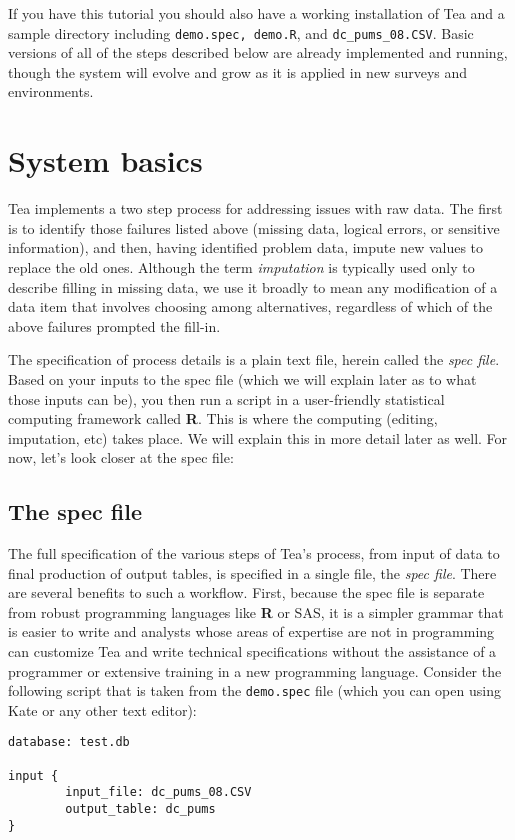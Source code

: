 \documentclass{article}
\begin{document}
If you have this tutorial you should also have a working installation of Tea and 
a sample directory including {\tt demo.spec, demo.R}, and {\tt dc\_pums\_08.CSV}. 
Basic versions of all of the steps described below are already implemented and running,
though the system will evolve and grow as it is applied in new surveys and environments.

\section{System basics}\label{basicssec}
Tea implements a two step process for addressing issues with raw data. The first is to
identify those failures listed above (missing data, logical errors, or sensitive
information), and then, having identified problem data, impute new values
to replace the old ones. Although the term {\em imputation} is typically used only to 
describe filling in missing data, we use it broadly to mean any modification of a 
data item that involves choosing among alternatives, regardless of which of the 
above failures prompted the fill-in. 

The specification of process details is a plain text file, herein called the {\em
spec file}. Based on your inputs to the spec file (which we will explain later as
to what those inputs can be), you then run a script in a user-friendly statistical
computing framework called {\bf R}. This is where the computing (editing, imputation,
etc) takes place. We will explain this in more detail later as well. For now, let's
look closer at the spec file:

\subsection{The spec file}\label{specsec}
The full specification of the various steps of Tea's process, from input of data to final
production of output tables, is specified in a single file, the {\em spec file}. There
are several benefits to such a workflow.  First, because the spec file is separate from
robust programming languages like \textbf{R} or SAS, it is a simpler grammar that is easier to
write and analysts whose areas of expertise are not in programming can customize Tea
and write technical specifications without the assistance of a programmer or extensive
training in a new programming language. Consider the following script that is taken
from the {\tt demo.spec} file (which you can open using Kate or any other text editor):

\begin{verbatim}
database: test.db

input {
        input_file: dc_pums_08.CSV
        output_table: dc_pums
}
\end{verbatim}
\end{document}
